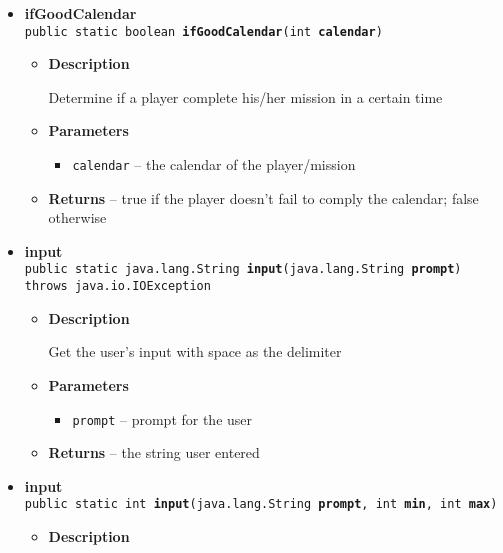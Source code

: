 {{{\begin{itemize}
{\begin{itemize}
{Display help information
}
\end{itemize}
}%
\item{ 
{\bf  ifGoodCalendar}\\
\texttt{public static boolean\ {\bf  ifGoodCalendar}(\texttt{int\lbrack \rbrack } {\bf  calendar})
\label{personOfInterest.Game.ifGoodCalendar(int[])}}%
\begin{itemize}
\item{
{\bf  Description}

Determine if a player complete his/her mission in a certain time
}
\item{
{\bf  Parameters}
  \begin{itemize}
   \item{
\texttt{calendar} -- the calendar of the player/mission}
  \end{itemize}
}%
\item{{\bf  Returns} -- 
true if the player doesn't fail to comply the calendar; false otherwise 
}%
\end{itemize}
}%
\item{ 
{\bf  input}\\
\texttt{public static java.lang.String\ {\bf  input}(\texttt{java.lang.String} {\bf  prompt}) throws java.io.IOException
\label{personOfInterest.Game.input(java.lang.String)}}%
\begin{itemize}
\item{
{\bf  Description}

Get the user's input with space as the delimiter
}
\item{
{\bf  Parameters}
  \begin{itemize}
   \item{
\texttt{prompt} -- prompt for the user}
  \end{itemize}
}%
\item{{\bf  Returns} -- 
the string user entered 
}%
\end{itemize}
}%
\item{ 
{\bf  input}\\
\texttt{public static int\ {\bf  input}(\texttt{java.lang.String} {\bf  prompt},
\texttt{int} {\bf  min},
\texttt{int} {\bf  max})
\label{personOfInterest.Game.input(java.lang.String, int, int)}}%
\begin{itemize}
\item{
{\bf  Description}

}
\end{itemize}}
\end{itemize}}}}
